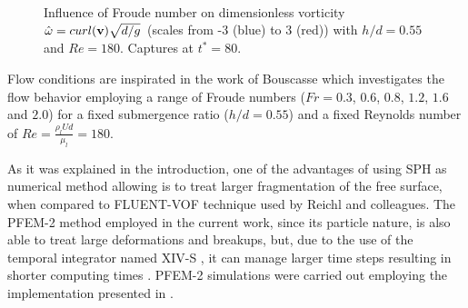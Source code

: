\begin{figure}[htbp]
\begin{center}
{    } \\
 \\
 \\
  \end{center}
  \caption{Influence of Froude number on dimensionless vorticity $\hat\omega = curl(\mathbf{v}) \sqrt{d/g}$ (scales from -3 (blue) to 3 (red)) with $h/d = 0.55$ and $Re=180$. Captures at $t^*=80$.
}
\label{fg:vort_Re180}
\end{figure}

Flow conditions are inspirated in the work of Bouscasse \cite{Bouscasse14} which investigates the flow behavior employing a range of Froude numbers ($Fr=0.3$, $0.6$, $0.8$, $1.2$, $1.6$ and $2.0$) for a fixed submergence ratio ($h/d=0.55$) and a fixed Reynolds number of $Re=\frac{\rho_l U d}{\mu_l}=180$.

As it was explained in the introduction, one of the advantages of using SPH as numerical method allowing is to treat larger fragmentation of the free surface, when compared to FLUENT-VOF technique used by Reichl and colleagues. The PFEM-2 method employed in the current work, since its particle nature, is also able to treat large deformations and breakups, but, due to the use of the temporal integrator named XIV-S \cite{Idelsohn12}, it can manage larger time steps resulting in shorter computing times \cite{Gimenez2015186}. PFEM-2 simulations were carried out employing the implementation presented in \cite{Gimenez14}.



